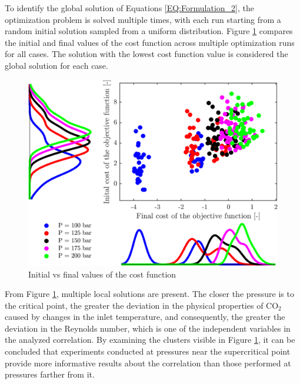 \documentclass[../Article_Sensitivity_Analsysis.tex]{subfiles}
\begin{document}
	To identify the global solution of Equations \ref{EQ:Formulation_2},  the optimization problem is solved multiple times, with each run starting from a random initial solution sampled from a uniform distribution. Figure \ref{fig:scatter_T} compares the initial and final values of the cost function across multiple optimization runs for all cases. The solution with the lowest cost function value is considered the global solution for each case.
	
	\begin{figure}[h!]
		\centering
		\includegraphics[width=\columnwidth]{Figures/Results/scatter.png}	
		\caption{Initial vs final values of the cost function}
		\label{fig:scatter_T}
	\end{figure}
	
	From Figure \ref{fig:scatter_T}, multiple local solutions are present. The closer the pressure is to the critical point, the greater the deviation in the physical properties of CO$_2$ caused by changes in the inlet temperature, and consequently, the greater the deviation in the Reynolds number, which is one of the independent variables in the analyzed correlation. By examining the clusters visible in Figure \ref{fig:scatter_T}, it can be concluded that experiments conducted at pressures near the supercritical point provide more informative results about the correlation than those performed at pressures farther from it.
	
\end{document}
